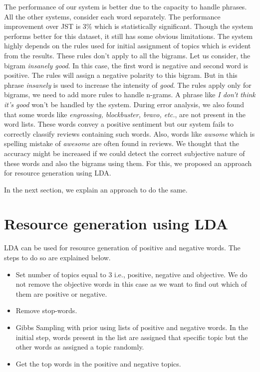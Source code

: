 The performance of our system is better due to the capacity to handle phrases. All the other systems, consider each word separately. The performance improvement over JST is
3\% which is statistically significant. Though the system performs better for this dataset, it still has some obvious limitations. The system highly depends on the rules 
used for initial assignment of topics which is evident from the results. These rules don't apply to all the bigrams. Let us consider, the bigram \textit{insanely good}. In
this case, the first word is negative and second word is positive. The rules will assign a negative polarity to this bigram. But in this phrase \textit{insanely} is used to
increase the intensity of \textit{good}. The rules apply only for bigrams, we need to add more rules to handle n-grams. A phrase like \textit{I don't think it's good} won't
be handled by the system. During error analysis, we also found that some words like \textit{engrossing, blockbuster, bravo, etc.}, are not present in the word lists. These 
words convey a positive sentiment but our system fails to correctly classify reviews containing such words. Also, words like \textit{awsome} which is spelling mistake of 
\textit{awesome} are often found in reviews. We thought that the accuracy might be increased if we could detect the correct subjective nature of these words and also the 
bigrams using them. For this, we proposed  an approach for resource generation using LDA.

In the next section, we explain an approach to do the same.

\section{Resource generation using LDA}

LDA can be used for resource generation of positive and negative words. The steps to do so are explained below.

\begin{itemize}
 \itemsep0em
 \item Set number of topics equal to 3 i.e., positive, negative and objective. We do not remove the objective
 words in this case as we want to find out which of them are positive or negative.
 \item Remove stop-words.
 \item Gibbs Sampling with prior using lists of positive and negative words. In the initial step, words present 
 in the list are assigned that specific topic but the other words as assigned a topic randomly.
 \item Get the top words in the positive and negative topics.
\end{itemize}

